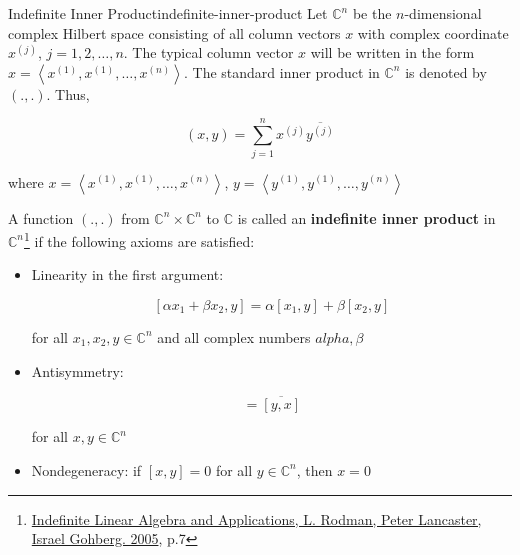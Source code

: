 \begin{Definition}{Indefinite Inner Product}{indefinite-inner-product}
    Let $\mathbb{C}^n$ be the $n$-dimensional complex Hilbert space consisting of all column vectors $x$ with complex
    coordinate $x^{(j)}$, $j = 1, 2, \ldots, n$. The typical column vector $x$ will be written in the form\\
    $x = \left< x^{(1)}, x^{(1)}, \ldots, x^{(n)} \right>$. The standard inner product in $\mathbb{C}^n$ is denoted by
    $(.,.)$. Thus,

    \begin{equation}
        (x, y) = \sum_{j = 1}^n x^{(j)}\overline{y^{(j)}}
    \end{equation}

    where $x = \left< x^{(1)}, x^{(1)}, \ldots, x^{(n)} \right>$, $y = \left< y^{(1)}, y^{(1)}, \ldots, y^{(n)} \right>$

    A function $(.,.)$ from $\mathbb{C}^n \times \mathbb{C}^n$ to $\mathbb{C}$ is called an \textbf{indefinite inner
    product} in $\mathbb{C}^n$\footnote{\href{https://trello.com/c/lJkdFDVf}{Indefinite Linear Algebra and Applications, L. Rodman, Peter Lancaster, Israel Gohberg. 2005}, p.7} if the following axioms are satisfied:

    \begin{itemize}
        \item Linearity in the first argument:

              \begin{equation}
                  \left[ \alpha x_1 + \beta x_2, y \right] = \alpha [x_1, y] + \beta [x_2, y]
              \end{equation}

              for all $x_1, x_2, y \in \mathbb{C}^n$ and all complex numbers $alpha, \beta$
        \item Antisymmetry:

              \begin{equation}
                  [x, y] = \overline{[y, x]}
              \end{equation}

              for all $x, y \in \mathbb{C}^n$

        \item Nondegeneracy: if $[x, y] = 0$ for all $y \in \mathbb{C}^n$, then $x = 0$
    \end{itemize}
\end{Definition}
